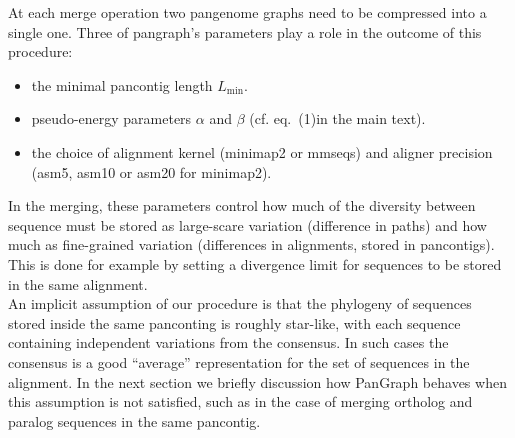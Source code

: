 \documentclass[aps,rmp,reprint,superscriptaddress,notitlepage,10pt,onecolumn]{revtex4-1}
\newcommand{\Lthr}{L_{\min}}
\begin{document}
At each merge operation two pangenome graphs need to be compressed into a single one. Three of pangraph's parameters play a role in the outcome of this procedure:
\begin{itemize}
    \item the minimal pancontig length $\Lthr$.
    \item pseudo-energy parameters $\alpha$ and $\beta$ (cf. eq.~(1)in the main text).
    \item the choice of alignment kernel (minimap2 or mmseqs) and aligner precision (asm5, asm10 or asm20 for minimap2).
\end{itemize}
In the merging, these parameters control how much of the diversity between sequence must be stored as large-scare variation (difference in paths) and how much as fine-grained variation (differences in alignments, stored in pancontigs). This is done for example by setting a divergence limit for sequences to be stored in the same alignment.\\
An implicit assumption of our procedure is that the phylogeny of sequences stored inside the same panconting is roughly star-like, with each sequence containing independent variations from the consensus. In such cases the consensus is a good ``average'' representation for the set of sequences in the alignment.
In the next section we briefly discussion how PanGraph behaves when this assumption is not satisfied, such as in the case of merging ortholog and paralog sequences in the same pancontig.\\
\end{document}
